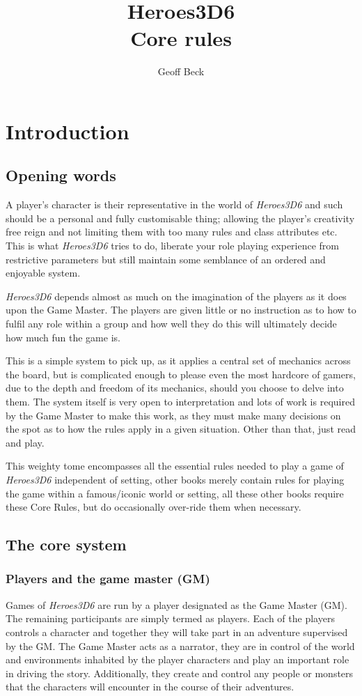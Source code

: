 \documentclass[a4paper,10pt,oneside]{book}
\title{\textbf{\huge Heroes3D6\\Core rules}}
\author{Geoff Beck}
\date{}
\begin{document}
\frontmatter
\maketitle
\tableofcontents
\mainmatter

\chapter{Introduction}

\section{Opening words}
A player's character is their representative in the world of \textit{Heroes3D6} and such should be a personal and fully customisable thing; allowing the player's creativity free reign and not limiting them with too many rules and class attributes etc. This is what \textit{Heroes3D6} tries to do, liberate your role playing experience from restrictive parameters but still maintain some semblance of an ordered and enjoyable system.

\textit{Heroes3D6} depends almost as much on the imagination of the players as it does upon the Game Master. The players are given little or no instruction as to how to fulfil any role within a group and how well they do this will ultimately decide how much fun the game is.

This is a simple system to pick up, as it applies a central set of mechanics across the board, but is complicated enough to please even the most hardcore of gamers, due to the depth and freedom of its mechanics, should you choose to delve into them. The system itself is very open to interpretation and lots of work is required by the Game Master to make this work, as they must make many decisions on the spot as to how the rules apply in a given situation. Other than that, just read and play.

This weighty tome encompasses all the essential rules needed to play a game of \textit{Heroes3D6} independent of setting, other books merely contain rules for playing the game within a famous/iconic world or setting, all these other books require these Core Rules, but do occasionally over-ride them when necessary.

\section{The core system}
\label{sec:base}

\subsection{Players and the game master (GM)}
Games of \textit{Heroes3D6} are run by a player designated as the Game Master (GM). The remaining participants are simply termed as players. Each of the players controls a character and together they will take part in an adventure supervised by the GM. The Game Master acts as a narrator, they are in control of the world and environments inhabited by the player characters and play an important role in driving the story. Additionally, they create and control any people or monsters that the characters will encounter in the course of their adventures. 
\end{document}
